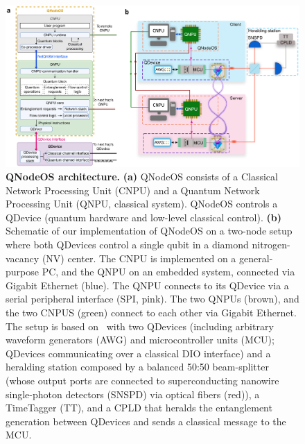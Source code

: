 \begin{figure}[htb]
\centering
\includegraphics[width=1\linewidth]{figures/qnodeos/main/fig2/fig2.png}
\caption{\textbf{QNodeOS architecture.} \textbf{(a)} QNodeOS consists of a Classical Network Processing Unit (CNPU) and a Quantum Network Processing Unit (QNPU, classical system). QNodeOS controls a QDevice (quantum hardware and low-level classical control).
\textbf{(b)} Schematic of our implementation of QNodeOS on a two-node setup where both QDevices control a single qubit in a diamond nitrogen-vacancy (NV) center. The CNPU is implemented on a general-purpose PC, and the QNPU on an embedded system, connected via Gigabit Ethernet (blue). The QNPU connects to its QDevice via a serial peripheral interface (SPI, pink). The two QNPUs (brown), and the two CNPUS (green) connect to each other via Gigabit Ethernet. The setup is based on~\cite{pompili_2022_experimental} with two QDevices (including arbitrary waveform generators (AWG) and microcontroller units (MCU); QDevices communicating over a classical DIO interface) and a heralding station composed by a balanced 50:50 beam-splitter (whose output ports are connected to superconducting nanowire single-photon detectors (SNSPD) via optical fibers (red)),  a  TimeTagger (TT), and a \ac{CPLD} that heralds the entanglement generation between QDevices and sends a classical message to the MCU.}
\label{fig:fig2}
\end{figure}

